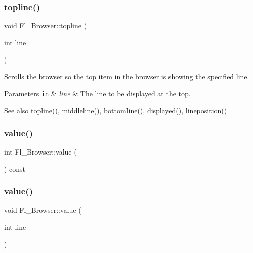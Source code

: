 \subsubsection{\texorpdfstring{topline()}{topline()}\hspace{0.1cm}{\footnotesize\ttfamily [2/2]}}
{\footnotesize\ttfamily void Fl\+\_\+\+Browser\+::topline (\begin{DoxyParamCaption}\item[{int}]{line }\end{DoxyParamCaption})\hspace{0.3cm}{\ttfamily [inline]}}

Scrolls the browser so the top item in the browser is showing the specified {\ttfamily line}. 
\begin{DoxyParams}[1]{Parameters}
\mbox{\tt in}  & {\em line} & The line to be displayed at the top. \\
\hline
\end{DoxyParams}
\begin{DoxySeeAlso}{See also}
\hyperlink{class_fl___browser_a4064f948e0191a8d7a0a4b39aaa632cd}{topline()}, \hyperlink{class_fl___browser_aeed63f2ef05839563c626c349fc40292}{middleline()}, \hyperlink{class_fl___browser_ad74d4d85549d4563a584ab0759832f6d}{bottomline()}, \hyperlink{class_fl___browser_aae4acb216ae3ae6261bd06fb9457e804}{displayed()}, \hyperlink{class_fl___browser_ab1266ecc779babeef0825e935d873dff}{lineposition()} 
\end{DoxySeeAlso}
\mbox{\label{class_fl___browser_ab5fb4b7c3981af6d05399fec54eb1aa9}} 
\subsubsection{\texorpdfstring{value()}{value()}\hspace{0.1cm}{\footnotesize\ttfamily [1/2]}}
{\footnotesize\ttfamily int Fl\+\_\+\+Browser\+::value (\begin{DoxyParamCaption}{ }\end{DoxyParamCaption}) const}

\mbox{\label{class_fl___browser_aa13e62327433a6106aa1feb4a72ac8bf}} 
\subsubsection{\texorpdfstring{value()}{value()}\hspace{0.1cm}{\footnotesize\ttfamily [2/2]}}
{\footnotesize\ttfamily void Fl\+\_\+\+Browser\+::value (\begin{DoxyParamCaption}\item[{int}]{line }\end{DoxyParamCaption})\hspace{0.3cm}{\ttfamily [inline]}}

